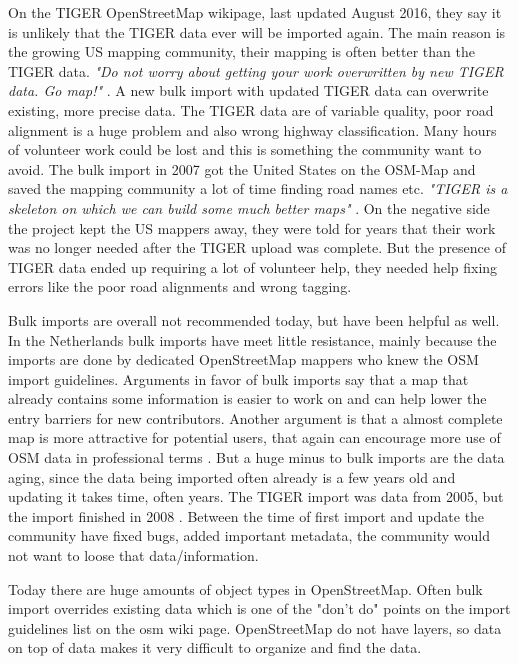 On the TIGER OpenStreetMap wikipage, last updated August 2016, they say it is unlikely that the TIGER data ever will be imported again. The main reason is the growing US mapping community, their mapping is often better than the TIGER data. \textit{"Do not worry about getting your work overwritten by new TIGER data. Go map!"}  \cite{WikiOSMTIGER2007}. A new bulk import with updated TIGER data can overwrite existing, more precise data. The TIGER data are of variable quality, poor road alignment is a huge problem and also wrong highway classification. Many hours of volunteer work could be lost and this is something the community want to avoid. The bulk import in 2007 got the United States on the OSM-Map and saved the mapping community a lot of time finding road names etc. \textit{"TIGER is a skeleton on which we can build some much better maps"} \cite{Willis2007}. On the negative side the project kept the US mappers away, they were told for years that their work was no longer needed after the TIGER upload was complete. But the presence of TIGER data ended up requiring a lot of volunteer help, they needed help fixing errors like the poor road alignments and wrong tagging. 

Bulk imports are overall not recommended today, but have been helpful as well. In the Netherlands bulk imports have meet little resistance, mainly because the imports are done by dedicated OpenStreetMap mappers who knew the OSM import guidelines.  Arguments in favor of bulk imports say that a map that already contains some information is easier to work on and can help lower the entry barriers for new contributors. Another argument is that a almost complete map is more attractive for potential users, that again can encourage more use of OSM data in professional terms \cite{Exelvan2010}. But a huge minus to bulk imports are the data aging, since the data being imported often already is a few years old and updating it takes time, often years. The TIGER import was data from 2005, but the import finished in 2008 \cite{Zielstra2013}. Between the time of first import and update the community have fixed bugs, added important metadata, the community would not want to loose that data/information. 

Today there are huge amounts of object types in OpenStreetMap. Often bulk import overrides existing data which is one of the "don't do" points on the import guidelines list on the osm wiki page. OpenStreetMap do not have layers, so data on top of data makes it very difficult to organize and find the data.   

